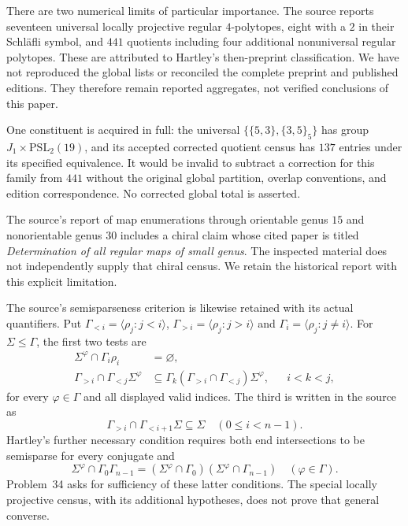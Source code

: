 \documentclass[11pt,a4paper]{article}
\newcommand{\gen}[1]{\langle #1\rangle}
\begin{document}
There are two numerical limits of particular importance.
The source reports seventeen universal locally projective
regular $4$-polytopes, eight with a $2$ in their Schl\"afli
symbol, and $441$ quotients including four additional
nonuniversal regular polytopes. These are attributed to
Hartley's then-preprint classification. We have not
reproduced the global lists or reconciled the complete
preprint and published editions. They therefore remain
reported aggregates, not verified conclusions of this paper.

One constituent is acquired in full: the universal
$\{\{5,3\},\{3,5\}_5\}$ has group
$J_1\times\mathrm{PSL}_2(19)$, and its accepted corrected
quotient census has $137$ entries under its specified
equivalence. It would be invalid to subtract a correction
for this family from $441$ without the original global
partition, overlap conventions, and edition correspondence.
No corrected global total is asserted.

The source's report of map enumerations through orientable
genus $15$ and nonorientable genus $30$ includes a chiral
claim whose cited paper is titled \emph{Determination of
all regular maps of small genus}. The inspected material
does not independently supply that chiral census. We
retain the historical report with this explicit limitation.

The source's semisparseness criterion is likewise retained
with its actual quantifiers. Put
$\Gamma_{<i}=\gen{\rho_j:j<i}$,
$\Gamma_{>i}=\gen{\rho_j:j>i}$ and
$\Gamma_i=\gen{\rho_j:j\ne i}$.
For $\Sigma\le\Gamma$, the first two tests are
\begin{align*}
 \Sigma^\varphi\cap\Gamma_i\rho_i&=\varnothing,\\
 \Gamma_{>i}\cap\Gamma_{<j}\Sigma^\varphi
 &\subseteq\Gamma_k(\Gamma_{>i}\cap\Gamma_{<j})\Sigma^\varphi,
                    &&i<k<j,
\end{align*}
for every $\varphi\in\Gamma$ and all displayed valid indices.
The third is written in the source as
\[
 \Gamma_{>i}\cap\Gamma_{<i+1}\Sigma\subseteq\Sigma
                                      \quad(0\le i<n-1).
\]
Hartley's further necessary condition requires both end
intersections to be semisparse for every conjugate and
\[
 \Sigma^\varphi\cap\Gamma_0\Gamma_{n-1}
   =(\Sigma^\varphi\cap\Gamma_0)
      (\Sigma^\varphi\cap\Gamma_{n-1})
                   \quad(\varphi\in\Gamma).
\]
Problem~34 asks for sufficiency of these latter conditions.
The special locally projective census, with its additional
hypotheses, does not prove that general converse.
\end{document}
